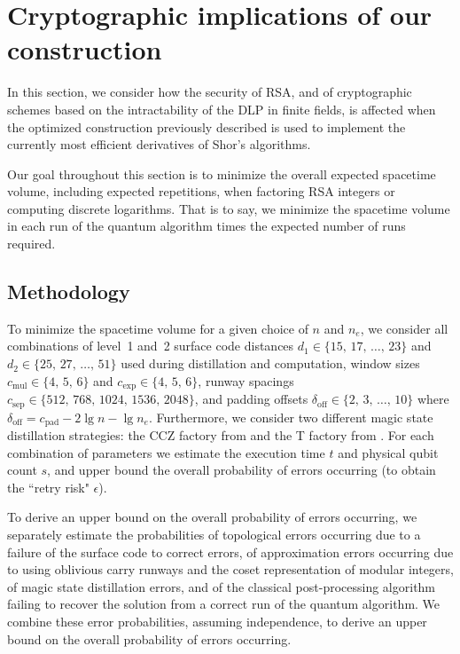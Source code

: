 \documentclass[a4paper, onecolumn, accepted=2021-03-29]{quantumarticle}
\newcommand{\lenexp}{{n_e}}
\newcommand{\devoff}{{\delta_{\text{off}}}}
\newcommand{\gexp}{{c_{\text{exp}}}}
\newcommand{\gmul}{{c_{\text{mul}}}}
\newcommand{\gsep}{{c_{\text{sep}}}}
\newcommand{\gpad}{{c_{\text{pad}}}}
\newcommand{\distone}{{d_1}}
\newcommand{\disttwo}{{d_2}}
\begin{document}
\section{Cryptographic implications of our construction}
\label{sec:impact}
In this section, we consider how the security of RSA, and of cryptographic schemes based on the intractability of the DLP in finite fields, is affected when the optimized construction previously described is used to implement the currently most efficient derivatives of Shor's algorithms.

Our goal throughout this section is to minimize the overall expected spacetime volume, including expected repetitions, when factoring RSA integers or computing discrete logarithms. That is to say, we minimize the spacetime volume in each run of the quantum algorithm times the expected number of runs required.

\subsection{Methodology}
\label{sec:methodology}
To minimize the spacetime volume for a given choice of $n$ and $\lenexp$, we consider all combinations of
  level~1 and~2 surface code distances $\distone \in \{ 15, \, 17, \, \dots, \, 23 \}$ and $\disttwo \in \{ 25, \, 27, \, \dots, \, 51 \}$ used during distillation and computation,
  window sizes $\gmul \in \{ 4, \, 5, \, 6 \}$ and $\gexp \in \{ 4, \, 5, \, 6 \}$,
  runway spacings $\gsep \in \{ 512, \, 768, \, 1024, \, 1536, \, 2048 \}$,
  and padding offsets $\devoff \in \{ 2, \, 3, \, \dots, \, 10 \}$ where $\devoff = \gpad - 2 \lg n - \lg \lenexp$.
Furthermore, we consider two different magic state distillation strategies: the CCZ factory from \cite{gidney2018magic, gidney2019autoccz} and the T factory from \cite{fowler2018}.
For each combination of parameters we estimate the execution time $t$ and physical qubit count $s$, and upper bound the overall probability of errors occurring (to obtain the ``retry risk" $\epsilon$).

To derive an upper bound on the overall probability of errors occurring, we separately estimate the probabilities
  of topological errors occurring due to a failure of the surface code to correct errors,
  of approximation errors occurring due to using oblivious carry runways and the coset representation of modular integers,
  of magic state distillation errors,
  and of the classical post-processing algorithm failing to recover the solution from a correct run of the quantum algorithm.
We combine these error probabilities, assuming independence, to derive an upper bound on the overall probability of errors occurring.
\end{document}
